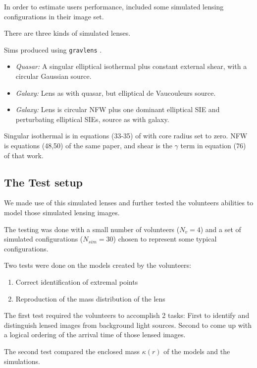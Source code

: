 In order to estimate users performance, \sw included some simulated lensing configurations in their image set.

There are three kinds of simulated lenses.

Sims produced using {\tt gravlens}
\citep{2001astro.ph..2341K,2001astro.ph..2340K}.

\begin{itemize}
  \item {\em Quasar:\/} A singular elliptical isothermal plus constant
    external shear, with a circular Gaussian source.
  \item {\em Galaxy:\/} Lens as with quasar, but elliptical de
    Vaucouleurs source.
  \item {\em Galaxy:\/} Lens is circular NFW plus one dominant
    elliptical SIE and perturbating elliptical SIEs, source as with
    galaxy.
\end{itemize}

Singular isothermal is in equations (33-35) of
\cite{2001astro.ph..2341K} with core radius set to zero. NFW is
equations (48,50) of the same paper, and shear is the $\gamma$ term in
equation (76) of that work.

\subsection{The Test setup} \label{sec:testsetup}
We made use of this simulated lenses and further tested the volunteers abilities to model those simulated lensing images.

The testing was done with a small number of volunteers ($N_v=4$) and a set of simulated configurations ($N_{sim}=30$) chosen to represent some typical configurations.

Two tests were done on the models created by the volunteers:

\begin{enumerate}
  \item Correct identification of extremal points
  \item Reproduction of the mass distribution of the lens
\end{enumerate}

The first test required the volunteers to accomplish 2 tasks: First to identify and distinguish lensed images from background light sources.
Second to come up with a logical ordering of the arrival time of those lensed images.

The second test compared the enclosed mass $\kappa(r)$ of the models and the simulations.
